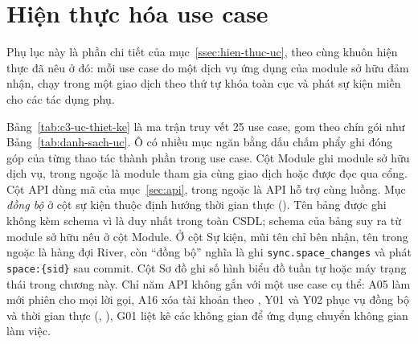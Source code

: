 \section{Hiện thực hóa use case}\label{pl:hien-thuc-uc}

Phụ lục này là phần chi tiết của mục~\ref{ssec:hien-thuc-uc}, theo cùng khuôn hiện thực đã nêu ở đó: mỗi use case do một dịch vụ ứng dụng của module sở hữu đảm nhận, chạy trong một giao dịch theo thứ tự khóa toàn cục và phát sự kiện miền cho các tác dụng phụ.

Bảng~\ref{tab:c3-uc-thiet-ke} là ma trận truy vết 25 use case, gom theo chín gói như Bảng~\ref{tab:danh-sach-uc}. Ô có nhiều mục ngăn bằng dấu chấm phẩy ghi đóng góp của từng thao tác thành phần trong use case. Cột Module ghi module sở hữu dịch vụ, trong ngoặc là module tham gia cùng giao dịch hoặc được đọc qua cổng. Cột API dùng mã của mục~\ref{sec:api}, trong ngoặc là API hỗ trợ cùng luồng. Mục \emph{đồng bộ} ở cột sự kiện thuộc định hướng thời gian thực (). Tên bảng được ghi không kèm schema vì là duy nhất trong toàn CSDL; schema của bảng suy ra từ module sở hữu nêu ở cột Module. Ở cột Sự kiện, mũi tên chỉ bên nhận, tên trong ngoặc là hàng đợi River, còn “đồng bộ” nghĩa là ghi \texttt{sync.space\_changes} và phát \texttt{space:\{sid\}} sau commit. Cột Sơ đồ ghi số hình biểu đồ tuần tự hoặc máy trạng thái trong chương này. Chỉ năm API không gắn với một use case cụ thể: A05 làm mới phiên cho mọi lời gọi, A16 xóa tài khoản theo , Y01 và Y02 phục vụ đồng bộ và thời gian thực (, ), G01 liệt kê các không gian để ứng dụng chuyển không gian làm việc.

